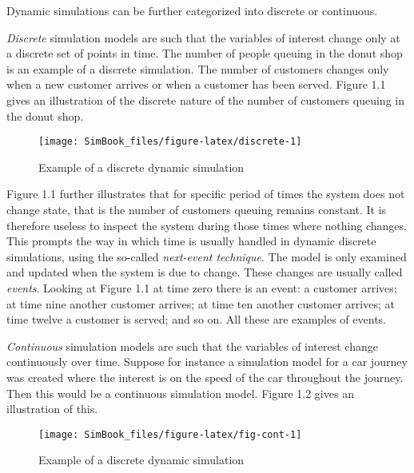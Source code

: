 \documentclass[
]{book}
\begin{document}
Dynamic simulations can be further categorized into discrete or continuous.

\emph{Discrete} simulation models are such that the variables of interest change only at a discrete set of points in time. The number of people queuing in the donut shop is an example of a discrete simulation. The number of customers changes only when a new customer arrives or when a customer has been served. Figure 1.1 gives an illustration of the discrete nature of the number of customers queuing in the donut shop.

\begin{figure}

{\centering \texttt{[image: SimBook\_files/figure-latex/discrete-1]} 

}

\caption{Example of a discrete dynamic simulation}\label{fig:discrete}
\end{figure}

Figure 1.1 further illustrates that for specific period of times the system does not change state, that is the number of customers queuing remains constant. It is therefore useless to inspect the system during those times where nothing changes. This prompts the way in which time is usually handled in dynamic discrete simulations, using the so-called \emph{next-event technique}. The model is only examined and updated when the system is due to change. These changes are usually called \emph{events}. Looking at Figure 1.1 at time zero there is an event: a customer arrives; at time nine another customer arrives; at time ten another customer arrives; at time twelve a customer is served; and so on. All these are examples of events.

\emph{Continuous} simulation models are such that the variables of interest change continuously over time. Suppose for instance a simulation model for a car journey was created where the interest is on the speed of the car throughout the journey. Then this would be a continuous simulation model. Figure 1.2 gives an illustration of this.

\begin{figure}

{\centering \texttt{[image: SimBook\_files/figure-latex/fig-cont-1]} 

}

\caption{Example of a discrete dynamic simulation}\label{fig:fig-cont}
\end{figure}
\end{document}
